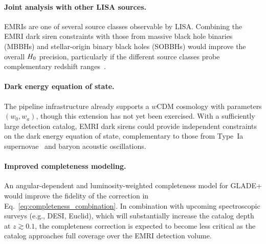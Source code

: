\paragraph{Joint analysis with other LISA sources.}
EMRIs are one of several source classes observable by LISA.  Combining
the EMRI dark siren constraints with those from massive black hole
binaries (MBBHs) and stellar-origin binary black holes (SOBBHs) would
improve the overall $H_0$ precision, particularly if the different
source classes probe complementary redshift
ranges~\cite{LISA:2024hlh,Chen:2017rfc}.

\paragraph{Dark energy equation of state.}
The pipeline infrastructure already supports a $w$CDM cosmology with
parameters $(w_0, w_a)$, though this extension has not yet been
exercised.  With a sufficiently large detection catalog, EMRI dark
sirens could provide independent constraints on the dark energy equation
of state, complementary to those from Type~Ia
supernovae~\cite{DES:2024tys} and baryon acoustic
oscillations.

\paragraph{Improved completeness modeling.}
An angular-dependent and luminosity-weighted completeness model for
GLADE+ would improve the fidelity of the correction in
Eq.~\eqref{eq:completeness_combination}.  In combination with upcoming
spectroscopic surveys (e.g., DESI, Euclid), which will substantially
increase the catalog depth at $z \gtrsim 0.1$, the completeness
correction is expected to become less critical as the catalog approaches
full coverage over the EMRI detection volume.

